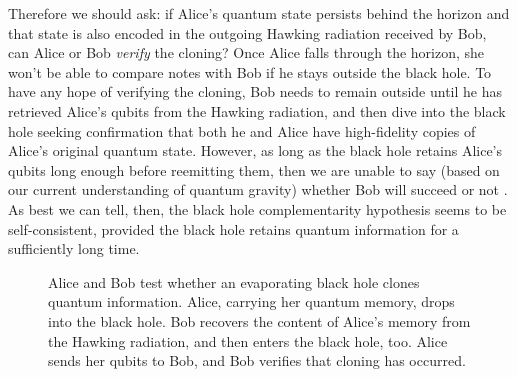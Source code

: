 \documentclass[11pt]{article}
\begin{document}
Therefore we should ask: if Alice's quantum state persists behind the horizon and that state is also encoded in the outgoing Hawking radiation received by Bob, can Alice or Bob {\em verify} the cloning? Once Alice falls through the horizon, she won't be able to compare notes with Bob if he stays outside the black hole. To have any hope of verifying the cloning, Bob needs to remain outside until he has retrieved Alice's qubits from the Hawking radiation, and then dive into the black hole seeking confirmation that both he and Alice have high-fidelity copies of Alice's original quantum state. However, as long as the black hole retains Alice's qubits long enough before reemitting them, then we are unable to say (based on our current understanding of quantum gravity) whether Bob will succeed or not \cite{susskind-gedanken,preskill-unpublished}. As best we can tell, then, the black hole complementarity hypothesis seems to be self-consistent, provided the black hole retains quantum information for a sufficiently long time.

\begin{figure}
\begin{center}
\leavevmode
\epsfxsize=4.5in
\end{center}
\caption{Alice and Bob test whether an evaporating black hole clones quantum information. Alice, carrying her quantum memory, drops into the black hole. Bob recovers the content of Alice's memory from the Hawking radiation, and then enters the black hole, too. Alice sends her qubits to Bob, and Bob verifies that cloning has occurred.}
\label{fig:cloning}
\end{figure}
\end{document}
